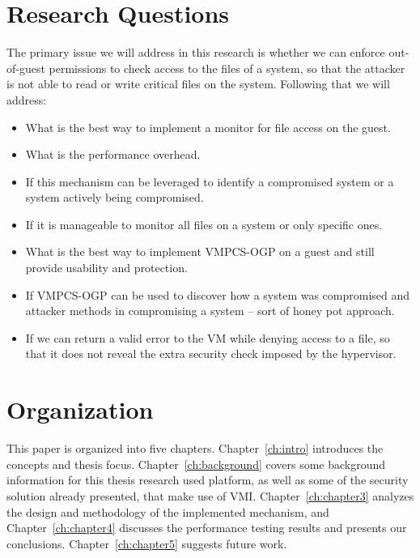 \section{Research Questions}\label{sec:question}
\par The primary issue we will address in this research is whether we can enforce out-of-guest permissions to check access to the files of a system, so that the attacker is not able to read or write critical files on the system. Following that we will address:
\begin{itemize}
	\item What is the best way to implement a monitor for file access on the guest.
	\item What is the performance overhead.
	\item If this mechanism can be leveraged to identify a compromised system or a system actively being compromised.
	\item If it is manageable to monitor all files on a system or only specific ones. 
	\item What is the best way to implement \ac{VMPCS-OGP} on a guest and still provide usability and protection.
	\item If \ac{VMPCS-OGP} can be used to discover how a system was compromised and attacker methods in compromising a system – sort of honey pot approach.
	\item If we can return a valid error to the VM while denying access to a file, so that it does not reveal the extra security check imposed by the hypervisor.
\end{itemize}

\section{Organization}\label{sec:organization}
This paper is organized into five chapters. Chapter~\ref{ch:intro} introduces the concepts and thesis focus. Chapter~\ref{ch:background} covers some background information for this thesis research used platform, as well as some of the security solution already presented, that make use of VMI. Chapter~\ref{ch:chapter3} analyzes the design and methodology of the implemented mechanism, and Chapter~\ref{ch:chapter4} discusses the performance testing results and presents our conclusions. Chapter~\ref{ch:chapter5} suggests future work.



